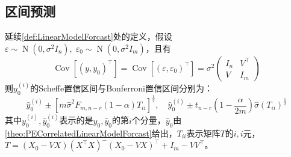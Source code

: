 \subsection{区间预测}
\begin{theorem}
	延续\ref{def:LinearModelForcast}处的定义，假设$\varepsilon\sim\operatorname{N}(0,\sigma^2I_n),\;\varepsilon_0\sim\operatorname{N}(0,\sigma^2I_m)$，且有
	\begin{equation*}
		\operatorname{Cov}[(y,y_0)^{\top}]=\operatorname{Cov}[(\varepsilon,\varepsilon_0)^{\top}]=\sigma^2
		\begin{pmatrix}
			I_n & V^{\top} \\
			V & I_m 
		\end{pmatrix}
	\end{equation*}
	则$y_0^{(i)}$的Scheffe置信区间与Bonferroni置信区间分别为：
	\begin{equation*}
		\hat{y}_0^{(i)}\pm[m\hat{\sigma}^2F_{m,n-r}(1-\alpha)T_{ii}]^{\frac{1}{2}},\quad
		\hat{y}_0^{(i)}\pm t_{n-r}\left(1-\frac{\alpha}{2m}\right)\hat{\sigma}(T_{ii})^{\frac{1}{2}}
	\end{equation*}
	其中$y_0^{(i)},\hat{y}_0^{(i)}$表示的是$y_0,\hat{y}_0$的第$i$个分量，$\hat{y}_0$由\cref{theo:PECorrelatedLinearModelForcast}给出，$T_{ii}$表示矩阵$T$的$i,i$元，$T=(X_0-VX)(X^{\top}X)^-(X_0-VX)^{\top}+I_m-VV^{\top}$。
\end{theorem}
